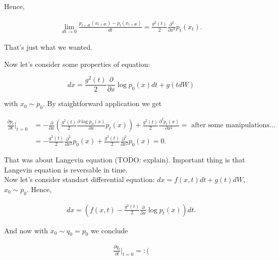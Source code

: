 \begin{enumerate}
    Hence, 

    \begin{equation*}
        \begin{aligned}
            \lim_{dt \to 0} \frac{p_{t + dt}(x_{t + dt}) - p_t(x_{t + dt})}{dt} = \frac{g^2(t)}{2} \frac{\partial^2}{\partial x^2} p_t (x_t). 
        \end{aligned}
    \end{equation*}

    That's just what we wanted. 
\end{enumerate}

Now let's consider some properties of equation:

\[ 
    dx = \frac{g^2 (t)}{2} \frac{\partial}{\partial x} \log p_0 (x) dt + g(t dW)
\]

with $x_0 \sim p_0$. By staightforward application we get 

\begin{equation*}
    \begin{aligned}
        \frac{\partial p_t}{\partial t} \vert_{t = 0} &= - \frac{\partial}{\partial x} \left( \frac{g^2 (t)}{2} \frac{\partial \log p_0(x)}{\partial x} p_t(x) \right) + \frac{g^2 (t)}{2} \frac{\partial^2 p_t (x)}{\partial x^2} = \text{ after some manipulations... } \\ 
        &= -\frac{g^2(t)}{2} \frac{\partial^2 }{\partial x^2} p_0(x) + \frac{g^2(t)}{2} \frac{\partial^2}{\partial x^2} p_0(x) = 0. 
    \end{aligned}
\end{equation*}

That was about Langevin equation (TODO: explain). Important thing is that Langevin equation is reversable in time. \\ 

Now let's consider standart differential equation: $dx = f(x, t) dt + g(t) dW$, $x_0 \sim p_0$. Hence, 

\begin{equation*}
    \begin{aligned}
        dx = \left( f(x, t) - \frac{g^2 (t)}{2} \frac{\partial}{\partial x} \log p_t (x) \right) dt. 
    \end{aligned}
\end{equation*}

And now with $x_0 \sim q_0 = p_0$ we conclude 

\begin{equation*}
    \begin{aligned}
        \frac{\partial q_t}{\partial t} \vert_{t = 0} = :(
    \end{aligned}
\end{equation*}


